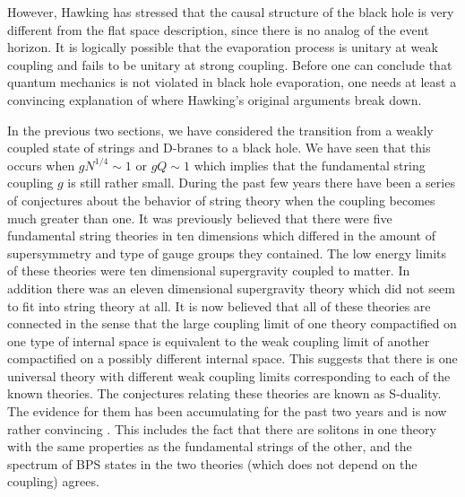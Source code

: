 However, Hawking has stressed that the causal structure of the black hole
is very different  from the flat space description, since there is no
analog of the event horizon. It is logically possible that the evaporation
process is unitary at weak coupling and fails to be unitary at strong
coupling. Before one can conclude that quantum mechanics is not
violated in  black hole evaporation, one needs at least a convincing
explanation of where Hawking's original arguments break down.



In the previous two sections,
we have considered the transition from a weakly coupled
state of strings and D-branes to a black hole. We have seen that
this occurs when $g N^{1/4}\sim 1$ or $gQ \sim 1$ which implies
that the fundamental
string coupling $g$ is
still rather small. During the past few years there have been a series
of conjectures about the behavior of string theory when the coupling
becomes much greater than one. It was previously believed
that there were five  fundamental
string theories in ten dimensions which differed in the amount of supersymmetry
and type of gauge groups they contained. The low energy limits of these
theories were ten dimensional supergravity coupled to matter.
In addition there was
an eleven dimensional supergravity theory which did not seem to fit into
string theory at all. It is now believed that all of these theories
are connected  in the sense that
the large coupling limit of one theory compactified on one type of internal
space is equivalent to the
weak coupling limit of another compactified on a possibly different
internal space. This suggests that there is one universal theory with different
weak coupling limits corresponding to each of the known theories.
The conjectures relating these theories are known as S-duality. The evidence
for them has been accumulating for the past two years 
and is now rather convincing \cite{pol2}.
This includes the fact that there are solitons in one theory with the
same properties as the fundamental strings of the other, 
and the spectrum
of BPS states in the two theories 
(which does not depend on the coupling) agrees.

